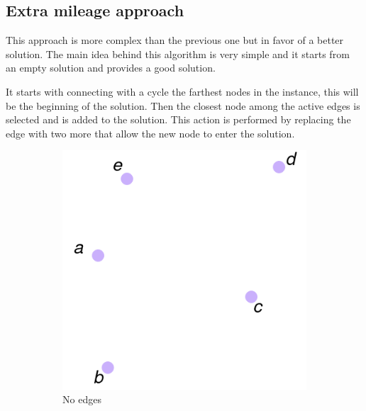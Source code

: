 \subsection{Extra mileage approach}
\label{sec:extra-mileage}
This approach is more complex than the previous one but in favor of a better solution. The main idea behind this algorithm is very simple and it starts from an empty solution and provides a good solution.

It starts with connecting with a cycle the farthest nodes in the instance, this will be the beginning of the solution. Then the closest node among the active edges is selected and is added to the solution. This action is performed by replacing the edge with two more that allow the new node to enter the solution.

\begin{figure}
	\centering
	\begin{subfigure}[b]{0.3\textwidth}
		\includegraphics[width=\textwidth]{images/extra_1}
		\caption{No edges}
	\end{subfigure}
	\hfill
	\begin{subfigure}[b]{0.3\textwidth}

\end{subfigure}
\end{figure}
